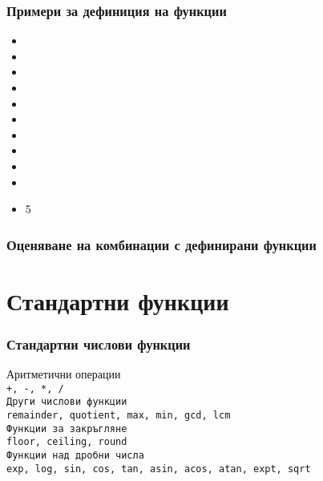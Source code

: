 \documentclass[alsotrans,beameroptions={aspectratio=169}]{beamerswitch}
\begin{document}
\begin{frame}
  \frametitle{Примери за дефиниция на функции}

  \begin{itemize}[<+->]
  \item {}
  \item {}
  \item {}
  \item {}
  \item {}
  \item {}
  \item {}
  \item {}
  \item {}
  \item {}
  \item {}5
  \end{itemize}

\end{frame}

\begin{frame}
  \frametitle{Оценяване на комбинации с дефинирани функции}
  \begin{center}
  \end{center}
\end{frame}

\section{Стандартни функции}

\begin{frame}
  \frametitle{Стандартни числови функции}

  Аритметични операции\\
  \tt{+}, \tt{-}, \tt{*}, \tt{/}\\[1em]
  Други числови функции\\
  \tt{remainder}, \tt{quotient}, \tt{max}, \tt{min}, \tt{gcd}, \tt{lcm}\\[1em]
  Функции за закръгляне\\
  \tt{floor}, \tt{ceiling}, \tt{round}\\[1em]
  Функции над дробни числа\\
  \tt{exp}, \tt{log}, \tt{sin}, \tt{cos}, \tt{tan}, \tt{asin}, \tt{acos}, \tt{atan}, \tt{expt}, \tt{sqrt}
\end{frame}
\end{document}
